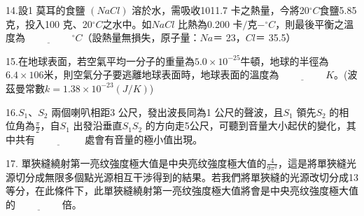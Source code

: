 \documentclass[cn,10pt,math=newtx]{elegantbook}
\begin{document}
\newpage

\begin{example}
   14.設1 莫耳的食鹽 $(NaCl)$ 溶於水，需吸收1011.7 卡之熱量，今將20$^\circ C$食鹽5.85 克，投入100 克、20$^\circ C$之水中。如$NaCl$ 比熱為0.200 $卡/克-^\circ C $，則最後平衡之溫度為$\underline{\hspace{2cm}} ^\circ C$（設熱量無損失，原子量：$Na
＝$ 23，$Cl＝$ 35.5）\\
    \rightline{[中壢高中教甄109]}
\end{example}
\begin{solution}
    
\end{solution}

\newpage

\begin{example}
   15.在地球表面，若空氣平均一分子的重量為$5.0\times 10^{-25} $牛頓，地球的半徑為$6.4 \times 106 米$，則空氣分子要逃離地球表面時，地球表面的溫度為$\underline{\hspace{2cm}} K$。(波茲曼常數$k=1.38\times10^{-23} (J/K)$)\\
    \rightline{[中壢高中教甄109]}
\end{example}
\begin{solution}
    
\end{solution}

\newpage

\begin{example}
   16.$S_1、S_2$ 兩個喇叭相距3 公尺，發出波長同為1 公尺的聲波，且$S_1$ 領先$S_2$ 的相位角為$\frac{\pi}{2}$，自$S_1$ 出發沿垂直$S_1 S_2$ 的方向走5公尺，可聽到音量大小起伏的變化，其中共有$\underline{\hspace{2cm}}$ 處會有音量的極小值出現。\\
    \rightline{[中壢高中教甄109]}
\end{example}
\begin{solution}
    
\end{solution}

\newpage

\begin{example}
   17. 單狹縫繞射第一亮纹強度極大值是中央亮纹強度極大值的$\frac{4}{9\pi^2}$，這是將單狹縫光源切分成無限多個點光源相互干涉得到的結果。若我們將單狹縫的光源改切分成13等分，在此條件下，此單狹縫繞射第一亮纹強度極大值將會是中央亮纹強度極大值的$\underline{\hspace{2cm}}$倍。\\
    \rightline{[中壢高中教甄109]}
\end{example}
\begin{solution}
    
\end{solution}
\end{document}
